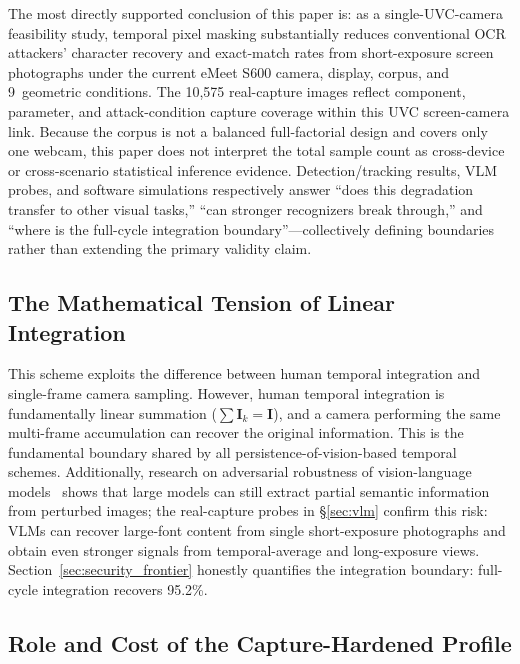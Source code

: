 \documentclass{ieeeaccess}
\begin{document}
The most directly supported conclusion of this paper is: as a single-UVC-camera feasibility study, temporal pixel masking substantially reduces conventional OCR attackers' character recovery and exact-match rates from short-exposure screen photographs under the current eMeet S600 camera, display, corpus, and 9~geometric conditions. The 10,575 real-capture images reflect component, parameter, and attack-condition capture coverage within this UVC screen-camera link. Because the corpus is not a balanced full-factorial design and covers only one webcam, this paper does not interpret the total sample count as cross-device or cross-scenario statistical inference evidence. Detection/tracking results, VLM probes, and software simulations respectively answer ``does this degradation transfer to other visual tasks,'' ``can stronger recognizers break through,'' and ``where is the full-cycle integration boundary''---collectively defining boundaries rather than extending the primary validity claim.

\subsection{The Mathematical Tension of Linear Integration}

This scheme exploits the difference between human temporal integration and single-frame camera sampling. However, human temporal integration is fundamentally linear summation ($\sum\mathbf{I}_k = \mathbf{I}$), and a camera performing the same multi-frame accumulation can recover the original information. This is the fundamental boundary shared by all persistence-of-vision-based temporal schemes. Additionally, research on adversarial robustness of vision-language models~\cite{b_li2025} shows that large models can still extract partial semantic information from perturbed images; the real-capture probes in \S\ref{sec:vlm} confirm this risk: VLMs can recover large-font content from single short-exposure photographs and obtain even stronger signals from temporal-average and long-exposure views. Section~\ref{sec:security_frontier} honestly quantifies the integration boundary: full-cycle integration recovers 95.2\%.

\subsection{Role and Cost of the Capture-Hardened Profile}
\end{document}
